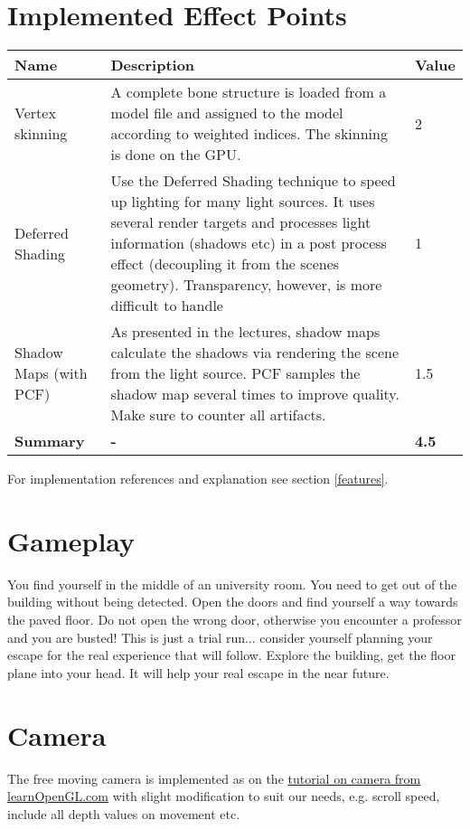\documentclass[12pt]{article}
\begin{document}
\section{Implemented Effect Points}
\begin{table}[h!]
  \centering
  \label{effectsTable}
  \begin{tabular}{l|p{10cm}|l}
    \textbf{Name} & \textbf{Description} & \textbf{Value}\\ \hline
      Vertex skinning & A complete bone structure is loaded from a model file and assigned to the model according to weighted indices. The skinning is done on the GPU. & 2	\\ \hline
      Deferred Shading & 	Use the Deferred Shading technique to speed up lighting for many light sources. It uses several render targets and processes light information (shadows etc) in a post process effect (decoupling it from the scenes geometry). Transparency, however, is more difficult to handle & 1\\ \hline
      Shadow Maps (with PCF) & 	As presented in the lectures, shadow maps calculate the shadows via rendering the scene from the light source. PCF samples the shadow map several times to improve quality. Make sure to counter all artifacts. & 1.5\\ \hline
      \textbf{Summary} & \textbf{-} & \textbf{4.5}\\
  \end{tabular}
\end{table}
For implementation references and explanation see section \ref{features}.



\section{Gameplay}
You find yourself in the middle of an university room. You need to get out of the building without being detected. Open the doors and find yourself a way towards the paved floor. Do not open the wrong door, otherwise you encounter a professor and you are busted!
This is just a trial run... consider yourself planning your escape for the real experience that will follow. Explore the building, get the floor plane into your head. It will help your real escape in the near future.


\section{Camera}
The free moving camera is implemented as on the \href{http://www.learnopengl.com/#!Getting-started/Camera}{tutorial on camera from learnOpenGL.com} with slight modification to suit our needs, e.g. scroll speed, include all depth values on movement etc.
\end{document}
